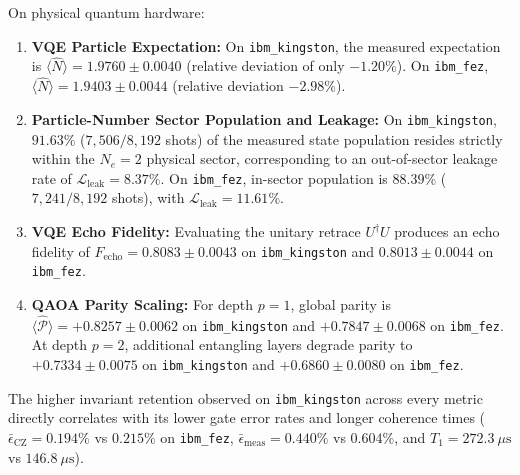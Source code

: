 \documentclass[aps,pra,reprint,superscriptaddress,floatfix,nofootinbib]{revtex4-2}
\begin{document}
On physical quantum hardware:
\begin{enumerate}
    \item \textbf{VQE Particle Expectation:} On \texttt{ibm\_kingston}, the measured expectation is $\langle \hat{N} \rangle = 1.9760 \pm 0.0040$ (relative deviation of only $-1.20\%$). On \texttt{ibm\_fez}, $\langle \hat{N} \rangle = 1.9403 \pm 0.0044$ (relative deviation $-2.98\%$).
    \item \textbf{Particle-Number Sector Population and Leakage:} On \texttt{ibm\_kingston}, $91.63\%$ ($7,506 / 8,192$ shots) of the measured state population resides strictly within the $N_e = 2$ physical sector, corresponding to an out-of-sector leakage rate of $\mathcal{L}_{\text{leak}} = 8.37\%$. On \texttt{ibm\_fez}, in-sector population is $88.39\%$ ($7,241 / 8,192$ shots), with $\mathcal{L}_{\text{leak}} = 11.61\%$.
    \item \textbf{VQE Echo Fidelity:} Evaluating the unitary retrace $U^\dagger U$ produces an echo fidelity of $F_{\text{echo}} = 0.8083 \pm 0.0043$ on \texttt{ibm\_kingston} and $0.8013 \pm 0.0044$ on \texttt{ibm\_fez}.
    \item \textbf{QAOA Parity Scaling:} For depth $p = 1$, global parity is $\langle \hat{\mathcal{P}} \rangle = +0.8257 \pm 0.0062$ on \texttt{ibm\_kingston} and $+0.7847 \pm 0.0068$ on \texttt{ibm\_fez}. At depth $p = 2$, additional entangling layers degrade parity to $+0.7334 \pm 0.0075$ on \texttt{ibm\_kingston} and $+0.6860 \pm 0.0080$ on \texttt{ibm\_fez}.
\end{enumerate}

The higher invariant retention observed on \texttt{ibm\_kingston} across every metric directly correlates with its lower gate error rates and longer coherence times ($\bar{\epsilon}_{\text{CZ}} = 0.194\%$ vs $0.215\%$ on \texttt{ibm\_fez}, $\bar{\epsilon}_{\text{meas}} = 0.440\%$ vs $0.604\%$, and $T_1 = 272.3\ \mu\text{s}$ vs $146.8\ \mu\text{s}$).
\end{document}
